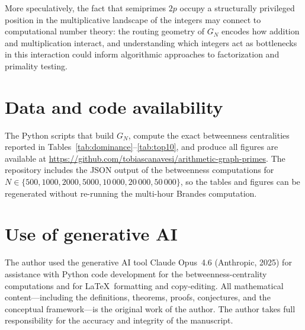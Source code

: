 \documentclass[11pt]{article}
\theoremstyle{plain}
\theoremstyle{definition}
\begin{document}
More speculatively, the fact that semiprimes $2p$ occupy a
structurally privileged position in the multiplicative landscape
of the integers may connect to computational number theory:
the routing geometry of $G_N$ encodes how addition and multiplication
interact, and understanding which integers act as bottlenecks
in this interaction could inform algorithmic approaches to
factorization and primality testing.


\section*{Data and code availability}

The Python scripts that build $G_N$, compute the exact betweenness centralities reported in Tables~\ref{tab:dominance}--\ref{tab:top10},
and produce all figures are available at
\url{https://github.com/tobiascanavesi/arithmetic-graph-primes}.
The repository includes the JSON output of the betweenness computations for $N \in \{500, 1000, 2000, 5000, 10\,000, 20\,000, 50\,000\}$,
so the tables and figures can be regenerated without re-running the multi-hour Brandes computation.

\section*{Use of generative AI}

The author used the generative AI tool Claude Opus~4.6 (Anthropic, 2025) for assistance with Python
code development for the betweenness-centrality computations and for \LaTeX\ formatting and copy-editing.
All mathematical content---including the definitions, theorems, proofs, conjectures, and the conceptual framework---is the original work of the author.
The author takes full responsibility for the accuracy and integrity of the manuscript.
\end{document}
